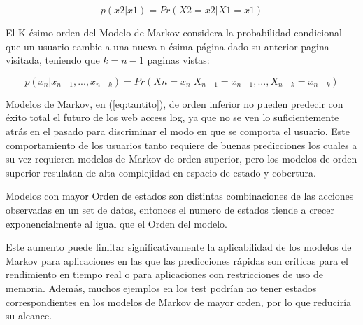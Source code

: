  $$ p(x2 | x1) = Pr(X2 = x2 | X1 = x1) $$
 
 El K-ésimo orden del Modelo de Markov considera la probabilidad condicional que un usuario cambie a una nueva  n-ésima página  dado su anterior pagina visitada, teniendo que $k = n -1$ paginas vistas:
 
 \begin{equation}\label{eq:tantito}
p( x_{n} | x_{n-1},..., x_{n-k} ) = Pr(X{n} = x_{n} | X_{n-1} = x_{n-1},..., X_{n-k} = x_{n-k}) 
 \end{equation}


 
 
 
 Modelos de Markov, en (\ref{eq:tantito}), de orden inferior no pueden predecir con éxito total el futuro de los web access log, ya que no se ven lo suficientemente atrás en el pasado para discriminar el modo en que se comporta el usuario. Este comportamiento de los usuarios tanto requiere de buenas predicciones los cuales a su vez requieren modelos de Markov de orden superior, pero los modelos de orden superior resulatan de alta complejidad en espacio de estado y cobertura.
 
Modelos con mayor Orden de estados son distintas combinaciones de las acciones observadas en un set de datos, entonces el numero de estados tiende a crecer exponencialmente al igual que el Orden del modelo.

Este aumento puede limitar significativamente la aplicabilidad de los modelos de Markov para aplicaciones en las que las predicciones rápidas son críticas para el rendimiento en tiempo real o para aplicaciones con restricciones de uso de memoria. Además, muchos ejemplos en los test podrían no tener estados correspondientes en los modelos de Markov de mayor orden, por lo que reduciría su alcance.
 
 

\nocite{*}
